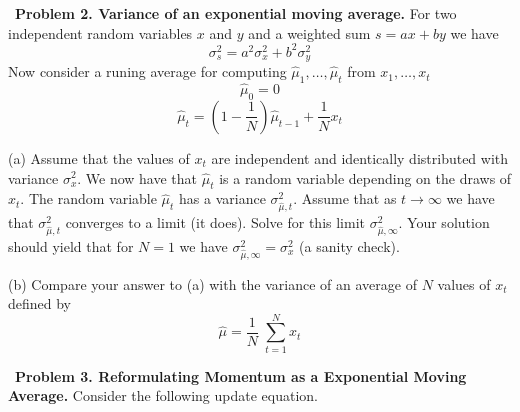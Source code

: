 \documentclass{article}
\newcommand{\solution}[1]{}
\begin{document}
\bigskip
~{\bf Problem 2. Variance of an exponential moving average.}  For two independent random variables $x$ and $y$ and a weighted sum $s = ax + by$ we have
$$\sigma_s^2 = a^2\sigma_x^2 + b^2\sigma_y^2$$
Now consider a runing average for computing $\hat{\mu}_1,\ldots,\hat{\mu}_t$ from $x_1,\ldots,x_t$
$$\hat{\mu}_0 = 0$$
$$\hat{\mu}_t = \left(1-\frac{1}{N}\right)\hat{\mu}_{t-1} + \frac{1}{N}x_t$$

\medskip
(a) Assume that the values of $x_t$ are independent and identically distributed with variance $\sigma_x^2$.
We now have that $\hat{\mu}_t$ is a random variable depending on the draws of $x_t$.  The random variable $\hat{\mu}_t$ has a variance $\sigma^2_{\hat{\mu},t}$.
Assume that as $t \rightarrow \infty$ we have that $\sigma^2_{\hat{\mu},t}$ converges to a limit (it does).  Solve for this limit $\sigma^2_{\hat{\mu},\infty}$.
Your solution should yield that for $N=1$ we have $\sigma^2_{\hat{\mu},\infty} = \sigma_x^2$ (a sanity check).

\solution{
  The limit must satisfy
  $$\sigma^2_{\hat{\mu},\infty} = \left(1-\frac{1}{N}\right)^2\sigma^2_{\hat{\mu},\infty} + \frac{1}{N^2}\sigma^2_x$$
  We can then solve for $\sigma^2_{\hat{\mu},\infty}$
  \begin{eqnarray*}
    \sigma^2_{\hat{\mu},\infty} &  =  &\left(1-\frac{2}{N} + \frac{1}{N^2}\right)\sigma^2_{\hat{\mu},\infty} + \frac{1}{N^2}\sigma^2_x \\
    \\
    0 &  =  &\left(\frac{- 2}{N} + \frac{1}{N^2}\right)\sigma^2_{\hat{\mu},\infty} + \frac{1}{N^2}\sigma^2_x \\
    \\
    & = & \left((-2) + \frac{1}{N}\right)\sigma^2_{\hat{\mu},\infty} + \frac{1}{N}\sigma^2_x \\
    \\
    \sigma^2_{\hat{\mu},\infty} & = & \frac{1}{\left(2-\frac{1}{N}\right)N}\;\; \sigma_x^2
  \end{eqnarray*}
}

\medskip
(b) Compare your answer to (a) with the variance of an average of $N$ values of $x_t$ defined by
$$\hat{\mu} = \frac{1}{N}\;\sum_{t=1}^N x_t$$

\solution{
  For an average of $N$ we have $\sigma_{\hat{\mu}}^2 = \sigma_x^2/N$.  For $N$ large we have that the answer to part (a) is about half as large.
}

\bigskip
~{\bf Problem 3. Reformulating Momentum as a Exponential Moving Average.} Consider the following update equation.
\end{document}
